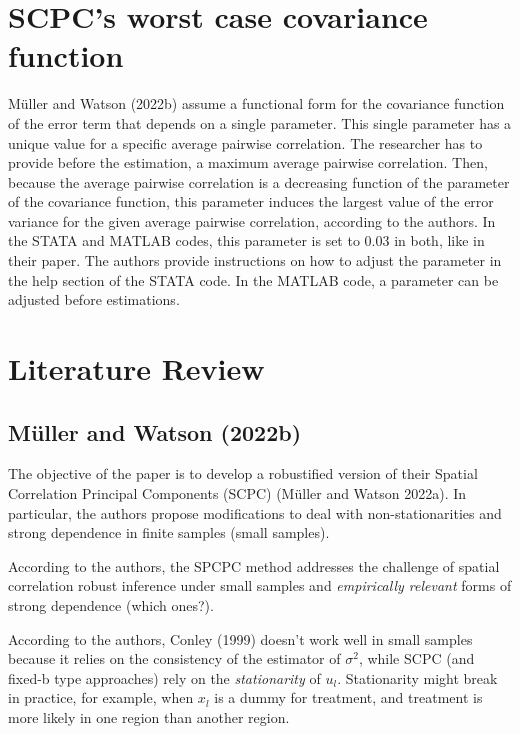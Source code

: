 \documentclass[
]{article}
\begin{document}
\hypertarget{sec-worstcov}{%
\section{SCPC's worst case covariance function}\label{sec-worstcov}}

Müller and Watson (2022b) assume a functional form for the covariance
function of the error term that depends on a single parameter. This
single parameter has a unique value for a specific average pairwise
correlation. The researcher has to provide before the estimation, a
maximum average pairwise correlation. Then, because the average pairwise
correlation is a decreasing function of the parameter of the covariance
function, this parameter induces the largest value of the error variance
for the given average pairwise correlation, according to the authors. In
the STATA and MATLAB codes, this parameter is set to 0.03 in both, like
in their paper. The authors provide instructions on how to adjust the
parameter in the help section of the STATA code. In the MATLAB code, a
parameter can be adjusted before estimations.

\hypertarget{literature-review}{%
\section{Literature Review}\label{literature-review}}

\hypertarget{muller2022jbes}{%
\subsection{Müller and Watson (2022b)}\label{muller2022jbes}}

The objective of the paper is to develop a robustified version of their
Spatial Correlation Principal Components (SCPC) (Müller and Watson
2022a). In particular, the authors propose modifications to deal with
non-stationarities and strong dependence in finite samples (small
samples).

According to the authors, the SPCPC method addresses the challenge of
spatial correlation robust inference under small samples and
\emph{empirically relevant} forms of strong dependence (which ones?).

According to the authors, Conley (1999) doesn't work well in small
samples because it relies on the consistency of the estimator of
\(\sigma^2\), while SCPC (and fixed-b type approaches) rely on the
\emph{stationarity} of \(u_l\). Stationarity might break in practice,
for example, when \(x_l\) is a dummy for treatment, and treatment is
more likely in one region than another region.
\end{document}
